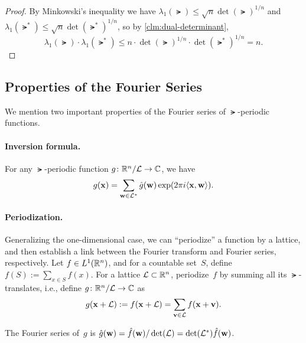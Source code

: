 \documentclass[11pt]{article}
\begin{document}
\begin{proof}
  By Minkowski's inequality we have
  $\lambda_1(\lat) \leq \sqrt{n} \det(\lat)^{1/n}$ and
  $\lambda_1(\lat^*) \leq \sqrt{n}\det(\lat^*)^{1/n}$, so by
  \cref{clm:dual-determinant},
  \[ \lambda_{1}(\lat) \cdot \lambda_{1}(\lat^{*}) \leq n \cdot
    \det(\lat)^{1/n} \cdot \det(\lat^*)^{1/n} = n . \]
\end{proof}

\subsection{Properties of the Fourier Series}

We mention two important properties of the Fourier series of
$\lat$-periodic functions.

\paragraph{Inversion formula.}

For any $\lat$-periodic function $g \colon \mathbb{R}^{n}/\mathcal{L} \to \mathbb{C}$, we
have
\[ g(\mathbf{x}) = \sum_{\mathbf{w} \in \mathcal{L}^*} \hat{g}(\mathbf{w}) \exp(2 \pi i
  \langle\mathbf{x},\mathbf{w}\rangle). \]

\paragraph{Periodization.}

Generalizing the one-dimensional case, we can ``periodize'' a function
by a lattice, and then establish a link between the Fourier transform
and Fourier series, respectively. Let $f \in L^{1}(\mathbb{R}^{n})$, and for a
countable set~$S$, define $f(S) := \sum_{x \in S} f(x)$. For a lattice
$\mathcal{L} \subset \mathbb{R}^{n}$, periodize~$f$ by summing all its
$\lat$-translates, i.e., define $g \colon \mathbb{R}^{n}/\mathcal{L} \to \mathbb{C}$ as
\begin{equation}
  \label{eq:periodize}
  g(\mathbf{x} + \mathcal{L}) := f(\mathbf{x} + \mathcal{L}) = \sum_{\mathbf{v} \in \mathcal{L}} f(\mathbf{x} +
  \mathbf{v}) .
\end{equation}

\begin{lemma}
  \label{lem:periodize-series}
  The Fourier series of~$g$ is
  $\hat{g}(\mathbf{w}) = \hat{f}(\mathbf{w}) / \det(\mathcal{L}) = \det(\mathcal{L}^{*})
  \hat{f}(\mathbf{w})$.
\end{lemma}
\end{document}
